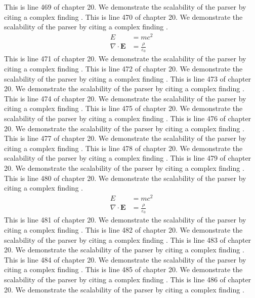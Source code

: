 This is line 469 of chapter 20. We demonstrate the scalability of the parser by citing a complex finding \cite{ref20_469}.
This is line 470 of chapter 20. We demonstrate the scalability of the parser by citing a complex finding \cite{ref20_470}.
\begin{align*}
  E &= mc^2 \\
  \nabla \cdot \mathbf{E} &= \frac{\rho}{\varepsilon_0}
\end{align*}
This is line 471 of chapter 20. We demonstrate the scalability of the parser by citing a complex finding \cite{ref20_471}.
This is line 472 of chapter 20. We demonstrate the scalability of the parser by citing a complex finding \cite{ref20_472}.
This is line 473 of chapter 20. We demonstrate the scalability of the parser by citing a complex finding \cite{ref20_473}.
This is line 474 of chapter 20. We demonstrate the scalability of the parser by citing a complex finding \cite{ref20_474}.
This is line 475 of chapter 20. We demonstrate the scalability of the parser by citing a complex finding \cite{ref20_475}.
This is line 476 of chapter 20. We demonstrate the scalability of the parser by citing a complex finding \cite{ref20_476}.
This is line 477 of chapter 20. We demonstrate the scalability of the parser by citing a complex finding \cite{ref20_477}.
This is line 478 of chapter 20. We demonstrate the scalability of the parser by citing a complex finding \cite{ref20_478}.
This is line 479 of chapter 20. We demonstrate the scalability of the parser by citing a complex finding \cite{ref20_479}.
This is line 480 of chapter 20. We demonstrate the scalability of the parser by citing a complex finding \cite{ref20_480}.
\begin{align*}
  E &= mc^2 \\
  \nabla \cdot \mathbf{E} &= \frac{\rho}{\varepsilon_0}
\end{align*}
This is line 481 of chapter 20. We demonstrate the scalability of the parser by citing a complex finding \cite{ref20_481}.
This is line 482 of chapter 20. We demonstrate the scalability of the parser by citing a complex finding \cite{ref20_482}.
This is line 483 of chapter 20. We demonstrate the scalability of the parser by citing a complex finding \cite{ref20_483}.
This is line 484 of chapter 20. We demonstrate the scalability of the parser by citing a complex finding \cite{ref20_484}.
This is line 485 of chapter 20. We demonstrate the scalability of the parser by citing a complex finding \cite{ref20_485}.
This is line 486 of chapter 20. We demonstrate the scalability of the parser by citing a complex finding \cite{ref20_486}.
